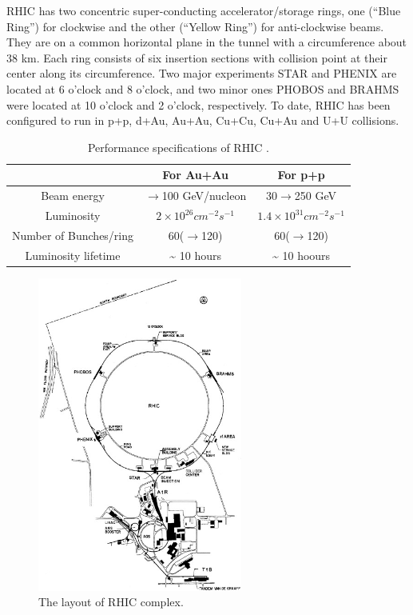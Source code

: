 RHIC has two concentric super-conducting accelerator/storage rings,
one (``Blue Ring'') for clockwise and the other (``Yellow Ring'')
for anti-clockwise beams. They are on a common horizontal plane in
the tunnel with a circumference about 38 km. Each ring consists of
six insertion sections with collision point at their center along
its circumference. Two major experiments STAR and PHENIX are located
at 6 o'clock and 8 o'clock, and two minor ones PHOBOS and BRAHMS were
located at 10 o'clock and 2 o'clock, respectively. To date, RHIC has
been configured to run in p+p, d+Au, Au+Au, Cu+Cu, Cu+Au and U+U collisions.

\begin{table}
\begin{centering}
\begin{tabular}{ccc}
\hline 
 & For Au+Au & For p+p\tabularnewline
\hline 
\hline 
Beam energy & $\rightarrow$100 GeV/nucleon & 30$\rightarrow$250 GeV\tabularnewline
Luminosity & $2\times10^{26}cm^{-2}s^{-1}$ & $1.4\times10^{31}cm^{-2}s^{-1}$\tabularnewline
Number of Bunches/ring & 60($\rightarrow$120) & 60($\rightarrow$120)\tabularnewline
Luminosity lifetime & \textasciitilde{} 10 hours & \textasciitilde{} 10 hoours\tabularnewline
\hline 
\end{tabular}
\par\end{centering}

\protect\caption{Performance specifications of RHIC \cite{Adler2003433}.}


\label{table: RHIC parameters}
\end{table}
 

\begin{figure}
\begin{centering}
\includegraphics[width=0.6\textwidth]{fig/2.Detector/RHIC_overview}
\par\end{centering}

\protect\caption{The layout of RHIC complex\cite{Hahn2003245}.}


\label{fig:RHIC overview}
\end{figure}


